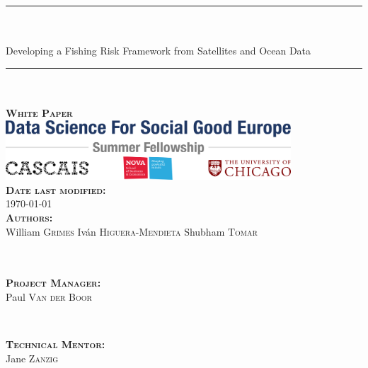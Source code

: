 \documentclass[11pt, english]{article}
\begin{document}
\hypersetup{linkcolor=darkgray}

\begin{titlepage}
\hypersetup{pageanchor=false}
    \begin{center}
        \vspace*{1cm}
        \Huge
	\par\noindent\rule{\textwidth}{0.4pt} \\ ~ \\
	Developing a Fishing Risk Framework from Satellites and Ocean Data \\
        \par\noindent\rule{\textwidth}{0.4pt} \\ ~ \\
        \huge
        \textbf{\textsc{White Paper}} \\
        \vspace{5cm}
        \includegraphics[width=0.8\textwidth]{images/logo} \\
        \vspace{2cm}
	\Large
	\textbf{\textsc{Date last modified:}} \\
        \today \\
        \vfill
	\Large
	\textbf{\textsc{Authors:}} \\
	William \textsc{Grimes} \hfill
	Iv\'{a}n \textsc{Higuera-Mendieta} \hfill
	Shubham \textsc{Tomar} \\~\\~\\
	\begin{minipage}{0.485\textwidth}
		\begin{flushleft}
			\Large
			\textbf{\textsc{Project Manager:}} \\
			Paul \textsc{Van der Boor}
		\end{flushleft}
	\end{minipage}
	~
	\begin{minipage}{0.485\textwidth}
		\begin{flushright}
			\Large
			\textbf{\textsc{Technical Mentor:}} \\
			Jane \textsc{Zanzig}
		\end{flushright}
	\end{minipage}
    \end{center}
\end{titlepage}
\end{document}
